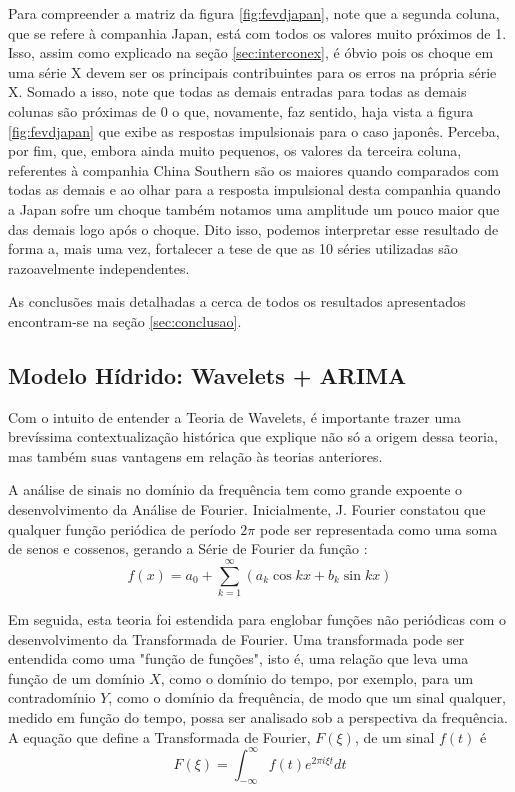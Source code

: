 \documentclass[12pt]{article}
\begin{document}
	Para compreender a matriz da figura \ref{fig:fevdjapan}, note que a segunda coluna, que se refere à companhia Japan, está com todos os valores muito próximos de 1. Isso, assim como explicado na seção \ref{sec:interconex}, é óbvio pois os choque em uma série \textrm{X} devem ser os principais contribuintes para os erros na própria série \textrm{X}. Somado a isso, note que todas as demais entradas para todas as demais colunas são próximas de 0 o que, novamente, faz sentido, haja vista a figura \ref{fig:fevdjapan} que exibe as respostas impulsionais para o caso japonês. Perceba, por fim, que, embora ainda muito pequenos, os valores da terceira coluna, referentes à companhia China Southern são os maiores quando comparados com todas as demais e ao olhar para a resposta impulsional desta companhia quando a Japan sofre um choque também notamos uma amplitude um pouco maior  que das demais logo após o choque. Dito isso, podemos interpretar esse resultado de forma a, mais uma vez, fortalecer a tese de que as 10 séries utilizadas são razoavelmente independentes.
	
	As conclusões mais detalhadas a cerca de todos os resultados apresentados encontram-se na seção \ref{sec:conclusao}.
	
	\subsection{Modelo Hídrido: Wavelets + ARIMA}
	
	Com o intuito de entender a Teoria de Wavelets, é importante trazer uma brevíssima contextualização histórica que explique não só a origem dessa teoria, mas também suas vantagens em relação às teorias anteriores.
	
	A análise de sinais no domínio da frequência tem como grande expoente o desenvolvimento da Análise de Fourier. Inicialmente, J. Fourier constatou que qualquer função periódica de período $2\pi$ pode ser representada como uma soma de senos e cossenos, gerando a \textrm{Série de Fourier} da função \cite{Wave_Graps}:
	\begin{equation*}
		f(x)=a_0+\sum_{k=1}^{\infty}(a_k\cos kx+b_k\sin kx)
	\end{equation*}
	
	Em seguida, esta teoria foi estendida para englobar funções não periódicas com o desenvolvimento da \textrm{Transformada de Fourier}. Uma transformada pode ser entendida como uma "função de funções", isto é, uma relação que leva uma função de um domínio $X$, como o domínio do tempo, por exemplo, para um contradomínio $Y$, como o domínio da frequência, de modo que um sinal qualquer, medido em função do tempo, possa ser analisado sob a perspectiva da frequência. A equação que define a \textrm{Transformada de Fourier}, $F(\xi)$, de um sinal $f(t)$ é
	\begin{equation*}
		F(\xi)=\int_{-\infty}^{\infty}f(t)e^{2\pi i\xi t}dt
	\end{equation*}
\end{document}
